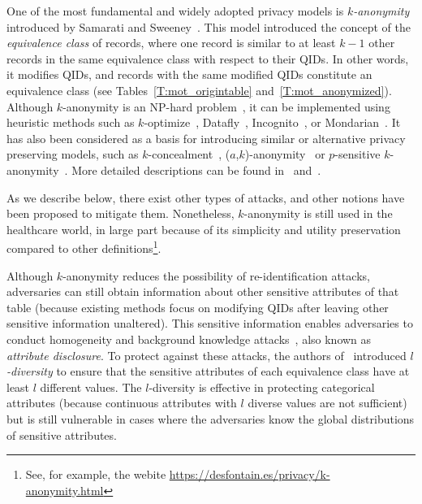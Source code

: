 One of the most fundamental and widely adopted privacy models is \textit{$k$-anonymity} introduced by Samarati and Sweeney~\cite{samarati1998protecting}. This model introduced the concept of the \textit{equivalence class} of records, where one record is similar to at least $k-1$ other records in the same equivalence class with respect to their QIDs. In other words, it modifies QIDs, and records with the same modified QIDs constitute an equivalence class (see Tables~\ref{T:mot_origintable} and~\ref{T:mot_anonymized}). Although $k$-anonymity is an NP-hard problem~\cite{meyerson_complexity_2004}, it can be implemented using heuristic methods such as $k$-optimize~\cite{bayardo_data_2005}, Datafly~\cite{samarati1998protecting}, Incognito~\cite{lefevre_incognito:_2005}, or Mondarian~\cite{LeFevre:2006:MMK:1129754.1129879}. 
It has also been considered as a basis for introducing similar or alternative privacy preserving models, such as $k$-concealment~\cite{tassa_k-concealment:_2012}, ($a$,$k$)-anonymity~\cite{wong__2006} or $p$-sensitive $k$-anonymity~\cite{truta_privacy_2006}. More detailed descriptions can be found in~\cite{fung_privacy-preserving_2010, domingo-ferrer_comparing_2001} and~\cite{aggarwal_general_2008}.

As we describe below, there exist other types of attacks, and  other notions have been proposed to mitigate them. Nonetheless, $k$-anonymity is still used in the healthcare world, in large part because of its simplicity and utility preservation compared to other definitions\footnote{See, for example, the webite \url{https://desfontain.es/privacy/k-anonymity.html}}.

Although $k$-anonymity reduces the possibility of re-identification attacks, adversaries can still obtain information about other sensitive attributes of that table (because existing methods focus on modifying QIDs after leaving other sensitive information unaltered). This sensitive information enables adversaries to conduct homogeneity and background knowledge attacks~\cite{machanavajjhala_l-diversity:_2007}, also known as \textit{attribute disclosure}. To protect against these attacks, the authors of~\cite{machanavajjhala_l-diversity:_2007} introduced \textit{$l$-diversity} to ensure that the sensitive attributes of each equivalence class have at least $l$ different values. The $l$-diversity is effective in protecting categorical attributes (because continuous attributes with $l$ diverse values are not sufficient) but is still vulnerable in cases where the adversaries know the global distributions of sensitive attributes.

